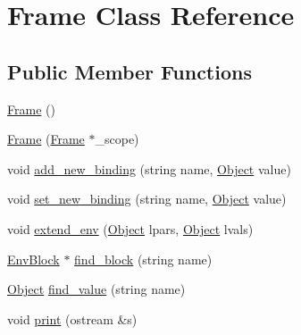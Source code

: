 \hypertarget{classFrame}{\section{Frame Class Reference}
\label{classFrame}
}
\subsection*{Public Member Functions}
\begin{DoxyCompactItemize}
\item 
\hyperlink{classFrame_ad2e5946cf41d4817e750500acf05d02b}{Frame} ()
\item 
\hyperlink{classFrame_ad6270328988c4bf73df7f24a0e7cf5f7}{Frame} (\hyperlink{classFrame}{Frame} $\ast$\-\_\-scope)
\item 
void \hyperlink{classFrame_aef63d90c2cd48dec6ac9b6dfd6f7d958}{add\-\_\-new\-\_\-binding} (string name, \hyperlink{classCell}{Object} value)
\item 
void \hyperlink{classFrame_a258655c409c6055a761ac8cc12fb2948}{set\-\_\-new\-\_\-binding} (string name, \hyperlink{classCell}{Object} value)
\item 
void \hyperlink{classFrame_a60853a5572534d23b5cf480c6217b9b8}{extend\-\_\-env} (\hyperlink{classCell}{Object} lpars, \hyperlink{classCell}{Object} lvals)
\item 
\hyperlink{classEnvBlock}{Env\-Block} $\ast$ \hyperlink{classFrame_abe6a8a4589d130373c89147b660de034}{find\-\_\-block} (string name)
\item 
\hyperlink{classCell}{Object} \hyperlink{classFrame_a148a624be2406df10c0655c9d87d0544}{find\-\_\-value} (string name)
\item 
void \hyperlink{classFrame_a5b0bcbaf2acba4166d94269a9b938834}{print} (ostream \&s)
\end{DoxyCompactItemize}


